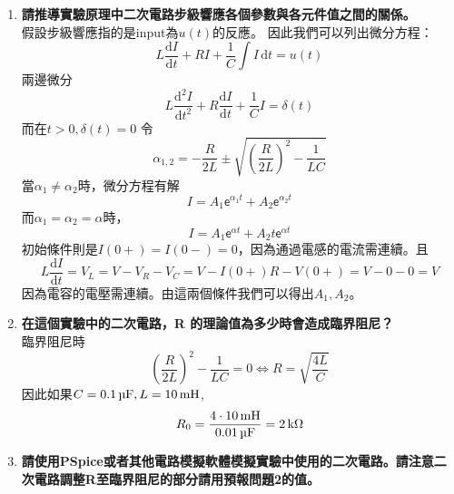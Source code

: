 \documentclass[12pt, a4paper]{article}
\def\large{\fontsize{14}{21}\selectfont}
\newcommand{\ex}{\mathsf{e}}
\newcommand{\dD}{\mathrm{d}}
\newcommand{\dI}{\,\mathrm{d}}
\begin{document}
  \begin{enumerate}[itemsep=20pt, topsep=10pt]
    \item {\large\bf 請推導實驗原理中二次電路步級響應各個參數與各元件值之間的關係。} \\[10pt]
      假設步級響應指的是input為$u(t)$的反應。
      因此我們可以列出微分方程：
      \[
        L\frac{\dD I}{\dD t} + RI + \frac{1}{C} \int I \dI t = u(t)
      \]
      兩邊微分
      \[
        L\frac{\dD^2 I}{\dD t^2} + R\frac{\dD I}{\dD t} + \frac{1}{C} I = \delta(t)
      \]
      而在$t > 0, \delta(t) = 0$
      令
      \[
        \alpha_{1, 2} = -\frac{R}{2L} \pm \sqrt{ \left( \frac{R}{2L} \right)^2 - \frac{1}{LC} } 
      \]
      當$\alpha_1 \neq \alpha_2$時，微分方程有解
      \[
        I = A_1 \ex^{\alpha_1 t} + A_2 \ex^{\alpha_2 t}
      \]
      而$\alpha_1 = \alpha_2 = \alpha$時，
      \[
        I = A_1 \ex^{\alpha t} + A_2 t \ex^{\alpha t}
      \]
      初始條件則是$I(0+) = I(0-) = 0$，因為通過電感的電流需連續。且
      \[
        L \frac{\dD I}{\dD t} = V_L = V - V_R - V_C = V - I(0+)R - V(0+) = V - 0 - 0 = V
      \]
      因為電容的電壓需連續。由這兩個條件我們可以得出$A_1, A_2$。
    \item {\large\bf 在這個實驗中的二次電路，R 的理論值為多少時會造成臨界阻尼？} \\[10pt]
      臨界阻尼時
      \[
        \left( \frac{R}{2L} \right)^2 - \frac{1}{LC} = 0 \Leftrightarrow R = \sqrt{\frac{4L}{C}}
      \]
      因此如果$C = \SI{0.1}\uF, L = \SI{10}\mH$, 
      \[ R_0 = \frac{4 \cdot \SI{10}\mH}{\SI{0.01}\uF} = \SI{2}\kohm \]
    \item {\large\bf 請使用PSpice或者其他電路模擬軟體模擬實驗中使用的二次電路。請注意二次電路調整R至臨界阻尼的部分請用預報問題2的值。} \\[10pt]


\end{enumerate}
\end{document}
